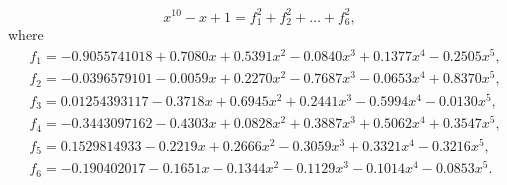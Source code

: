 \documentclass[runningheads]{llncs}
\begin{document}
{$$
{x}^{10}-x+1=f_1^2+f_2^2+\ldots+f_6^2,
$$
where
\begin{align*}
&f_1 = -0.9055741018 + 0.7080  x + 0.5391  x^2 - 0.0840  x^3 + 0.1377  x^4 - 0.2505  x^5,\\
&f_2 = -0.0396579101 - 0.0059  x + 0.2270  x^2 - 0.7687  x^3 - 0.0653  x^4 + 0.8370  x^5,\\
&f_3 = 0.01254393117 - 0.3718  x + 0.6945  x^2 + 0.2441  x^3 - 0.5994  x^4 - 0.0130  x^5,\\
&f_4 = -0.3443097162 - 0.4303  x + 0.0828  x^2 + 0.3887  x^3 + 0.5062  x^4 + 0.3547  x^5,\\
&f_5 = 0.1529814933 - 0.2219  x + 0.2666  x^2 - 0.3059  x^3 + 0.3321  x^4 - 0.3216  x^5,\\
&f_6 = -0.190402017 - 0.1651  x - 0.1344  x^2 - 0.1129  x^3 - 0.1014  x^4 - 0.0853  x^5.
\end{align*}
\smallskip

}
\end{document}
